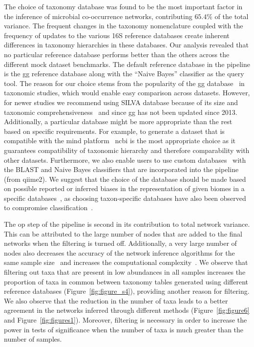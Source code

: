 \documentclass[letterpaper,12pt]{article}
\begin{document}
  The choice of taxonomy database was found to be the most important factor in the inference of microbial co-occurrence networks, contributing $65.4\%$ of the total variance.
  The frequent changes in the taxonomy nomenclature coupled with the frequency of updates to the various 16S reference databases create inherent differences \cite{Balvociute2017} in taxonomy hierarchies in these databases.
  Our analysis revealed that no particular reference database performs better than the others across the different mock dataset benchmarks.
  The default reference database in the pipeline is the \ac{gg} reference database along with the ``Naive Bayes'' classifier as the query tool.
  The reason for our choice stems from the popularity of the \ac{gg} database~\cite{parkEvaluation16SRRNA2018} in taxonomic studies, which would enable easy comparison across datasets.
  However, for newer studies we recommend using SILVA database because of its size and taxonomic comprehensiveness~\cite{iiRESCRIPtReproducibleSequence2021} and since \ac{gg} has not been updated since 2013.
  Additionally, a particular database might be more appropriate than the rest based on specific requirements.
  For example, to generate a dataset that is compatible with the \ac{mind} platform~\cite{huResourceComparisonIntegration2022} \ac{ncbi} is the most appropriate choice as it guarantees compatibility of taxonomic hierarchy and therefore comparability with other datasets.
  Furthermore, we also enable users to use custom databases~\cite{Ritari2015,iiRESCRIPtReproducibleSequence2021} with the BLAST and Naive Bayes classifiers that are incorporated into the pipeline (from \ac{qiime2}).
  We suggest that the choice of the database should be made based on possible reported or inferred biases in the representation of given biomes in a specific databases~\cite{Balvociute2017,iiRESCRIPtReproducibleSequence2021}, as choosing taxon-specific databases have also been observed to compromise classification~\cite{rmarcelinoUseTaxonspecificReference2020}.

  The \ac{op} step of the pipeline is second in its contribution to total network variance.
  This can be attributed to the large number of nodes that are added to the final networks when the filtering is turned off.
  Additionally, a very large number of nodes also decreases the accuracy of the network inference algorithms for the same sample size~\cite{peschelNetCoMiNetworkConstruction2020} and increases the computational complexity~\cite{tackmannRapidInferenceDirect2019}.
  We observe that filtering out taxa that are present in low abundances in all samples increases the proportion of taxa in common between taxonomy tables generated using different reference databases (Figure~\ref{fig:figure_s4}), providing another reason for filtering.
  We also observe that the reduction in the number of taxa leads to a better agreement in the networks inferred through different methods (Figure~\ref{fig:figure6} and Figure~\ref{fig:figures1}).
  Moreover, filtering is necessary in order to increase the power in tests of significance when the number of taxa is much greater than the number of samples.

\newpage
  \thispagestyle{empty}
  
  \thispagestyle{empty}
  

\end{document}
